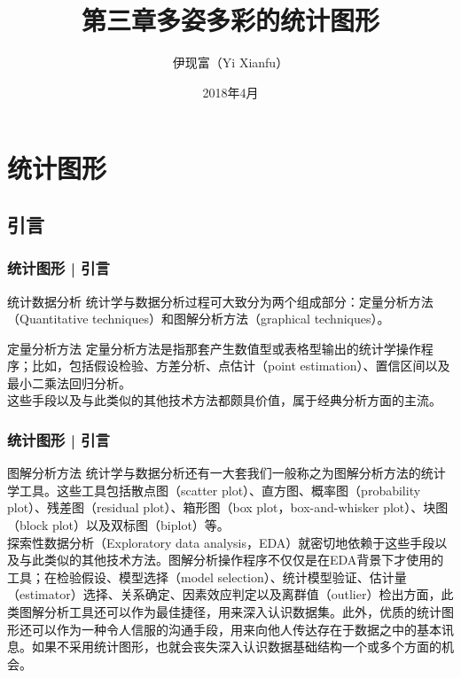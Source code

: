 



\title[统计图形]{第三章\quad 多姿多彩的统计图形}
\author[Yixf]{伊现富（Yi Xianfu）}
\date{2018年4月}




\section{统计图形}
\subsection{引言}
\begin{frame}
  \frametitle{统计图形 | 引言}
  \begin{block}{统计数据分析}
    统计学与数据分析过程可大致分为两个组成部分：定量分析方法（Quantitative techniques）和图解分析方法（graphical techniques）。
  \end{block}
  \pause
  \begin{block}{定量分析方法}
    定量分析方法是指那套产生数值型或表格型输出的统计学操作程序；比如，包括假设检验、方差分析、点估计（point estimation）、置信区间以及最小二乘法回归分析。\\
    \vspace{0.5em}
    这些手段以及与此类似的其他技术方法都颇具价值，属于经典分析方面的主流。
  \end{block}
\end{frame}

\begin{frame}
  \frametitle{统计图形 | 引言}
  \begin{block}{图解分析方法}
统计学与数据分析还有一大套我们一般称之为图解分析方法的统计学工具。这些工具包括散点图（scatter plot）、直方图、概率图（probability plot）、残差图（residual plot）、箱形图（box plot，box-and-whisker plot）、块图（block plot）以及双标图（biplot）等。\\
\vspace{0.5em}
探索性数据分析（Exploratory data analysis，EDA）就密切地依赖于这些手段以及与此类似的其他技术方法。图解分析操作程序不仅仅是在EDA背景下才使用的工具；在检验假设、模型选择（model selection）、统计模型验证、估计量（estimator）选择、关系确定、因素效应判定以及离群值（outlier）检出方面，此类图解分析工具还可以作为最佳捷径，用来深入认识数据集。此外，优质的统计图形还可以作为一种令人信服的沟通手段，用来向他人传达存在于数据之中的基本讯息。如果不采用统计图形，也就会丧失深入认识数据基础结构一个或多个方面的机会。
  \end{block}
\end{frame}


